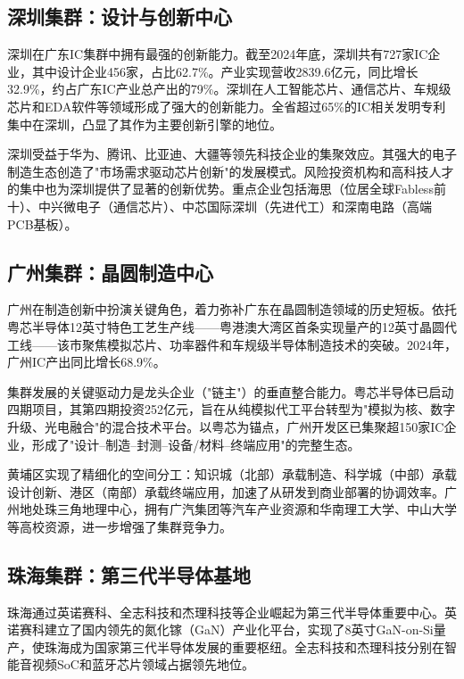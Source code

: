 \documentclass[12pt,a4paper]{article}
\begin{document}
\subsection{深圳集群：设计与创新中心}
\label{sec:sz_cluster}

深圳在广东IC集群中拥有最强的创新能力。截至2024年底，深圳共有727家IC企业，其中设计企业456家，占比62.7\%。产业实现营收2839.6亿元，同比增长32.9\%，约占广东IC产业总产出的79\%。深圳在人工智能芯片、通信芯片、车规级芯片和EDA软件等领域形成了强大的创新能力。全省超过65\%的IC相关发明专利集中在深圳，凸显了其作为主要创新引擎的地位。

深圳受益于华为、腾讯、比亚迪、大疆等领先科技企业的集聚效应。其强大的电子制造生态创造了"市场需求驱动芯片创新"的发展模式。风险投资机构和高科技人才的集中也为深圳提供了显著的创新优势。重点企业包括海思（位居全球Fabless前十）、中兴微电子（通信芯片）、中芯国际深圳（先进代工）和深南电路（高端PCB基板）。

\subsection{广州集群：晶圆制造中心}
\label{sec:gz_cluster}

广州在制造创新中扮演关键角色，着力弥补广东在晶圆制造领域的历史短板。依托粤芯半导体12英寸特色工艺生产线——粤港澳大湾区首条实现量产的12英寸晶圆代工线——该市聚焦模拟芯片、功率器件和车规级半导体制造技术的突破。2024年，广州IC产出同比增长68.9\%。

集群发展的关键驱动力是龙头企业（"链主"）的垂直整合能力。粤芯半导体已启动四期项目，其第四期投资252亿元，旨在从纯模拟代工平台转型为"模拟为核、数字升级、光电融合"的混合技术平台。以粤芯为锚点，广州开发区已集聚超150家IC企业，形成了"设计--制造--封测--设备/材料--终端应用"的完整生态。

黄埔区实现了精细化的空间分工：知识城（北部）承载制造、科学城（中部）承载设计创新、港区（南部）承载终端应用，加速了从研发到商业部署的协调效率。广州地处珠三角地理中心，拥有广汽集团等汽车产业资源和华南理工大学、中山大学等高校资源，进一步增强了集群竞争力。

\subsection{珠海集群：第三代半导体基地}
\label{sec:zh_cluster}

珠海通过英诺赛科、全志科技和杰理科技等企业崛起为第三代半导体重要中心。英诺赛科建立了国内领先的氮化镓（GaN）产业化平台，实现了8英寸GaN-on-Si量产，使珠海成为国家第三代半导体发展的重要枢纽。全志科技和杰理科技分别在智能音视频SoC和蓝牙芯片领域占据领先地位。
\end{document}
